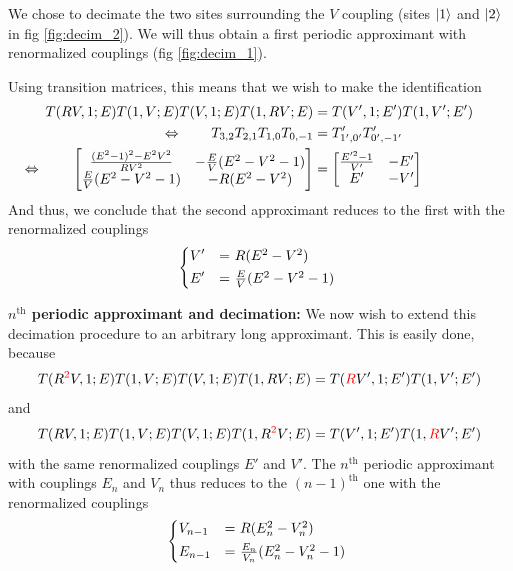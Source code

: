 \documentclass[11pt]{article}
\newcommand{\eq}{\llap{$\Leftrightarrow$ \qquad}}
\begin{document}
We chose to decimate the two sites surrounding the $V$ coupling (sites $\ket{1}$ and $\ket{2}$ in fig \eqref{fig:decim_2}). We will thus obtain a first periodic approximant with renormalized couplings (fig \eqref{fig:decim_1}).

Using transition matrices, this means that we wish to make the identification
\begin{align}
	T(RV,1;E)T(1,V;E)T(V,1;E)T(1,RV;E) &= T(V',1;E')T(1,V';E') \\
	\eq T_{3,2}T_{2,1}T_{1,0}T_{0,-1} &= T'_{1',0'}T'_{0',-1'} \\
	\eq \begin{bmatrix}
			\frac{(E^2-1)^2-E^2V^2}{RV^2} & -\frac{E}{V}(E^2-V^2-1)\\
			\frac{E}{V}(E^2-V^2-1) & -R(E^2-V^2)\\
		\end{bmatrix} &=
		\begin{bmatrix}
			\frac{E^{\prime2}-1}{V'} & -E'\\
			E' & -V'\\
		\end{bmatrix}
\end{align}
And thus, we conclude that the second approximant reduces to the first with the renormalized couplings
\begin{equation}
	\begin{dcases*}
        	V' &= $R(E^2-V^2)$ \\
        	E' &= $\frac{E}{V}(E^2-V^2-1)$
     \end{dcases*}
\end{equation}

\textbf{$n^\text{th}$ periodic approximant and decimation:}
We now wish to extend this decimation procedure to an arbitrary long approximant. 
This is easily done, because
\begin{equation}
	T({R^{\color{red}2}}V,1;E)T(1,V;E)T(V,1;E)T(1,RV;E) = T({\color{red}R}V',1;E')T(1,V';E')
\end{equation}
and
\begin{equation}
	T(RV,1;E)T(1,V;E)T(V,1;E)T(1,{R^{\color{red}2}}V;E) = T(V',1;E')T(1,{\color{red}R}V';E')
\end{equation}
with the same renormalized couplings $E'$ and $V'$.
The $n^\text{th}$ periodic approximant with couplings $E_n$ and $V_n$ thus reduces to the $(n-1)^\text{th}$ one with the renormalized couplings
\begin{equation}
	\begin{dcases*}
        	V_{n-1} &= $R(E_n^2-V_n^2)$ \\
        	E_{n-1} &= $\frac{E_n}{V_n}(E_n^2-V_n^2-1)$
     \end{dcases*}
\end{equation}
{}

\end{document}

